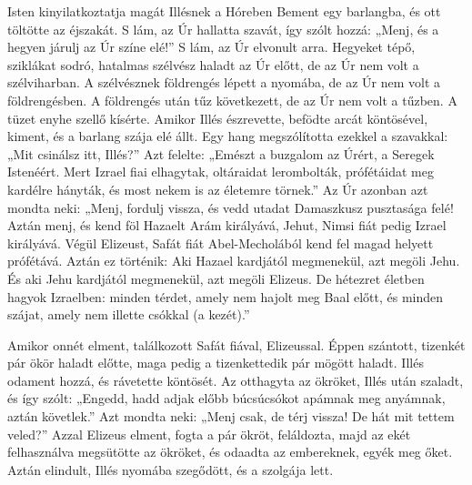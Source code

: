 \documentclass[twoside]{article}
\begin{document}
\begin{lectio}{Isten kinyilatkoztatja magát Illésnek a Hóreben}
Bement egy barlangba, és ott töltötte az éjszakát. S lám, az Úr hallatta szavát, így szólt hozzá: „Menj, és a hegyen járulj az Úr színe elé!” S lám, az Úr elvonult arra. Hegyeket tépő, sziklákat sodró, hatalmas szélvész haladt az Úr előtt, de az Úr nem volt a szélviharban. A szélvésznek földrengés lépett a nyomába, de az Úr nem volt a földrengésben. A földrengés után tűz következett, de az Úr nem volt a tűzben. A tüzet enyhe szellő kísérte. Amikor Illés észrevette, befödte arcát köntösével, kiment, és a barlang szája elé állt. Egy hang megszólította ezekkel a szavakkal: „Mit csinálsz itt, Illés?” Azt felelte: „Emészt a buzgalom az Úrért, a Seregek Istenéért. Mert Izrael fiai elhagytak, oltáraidat lerombolták, prófétáidat meg kardélre hányták, és most nekem is az életemre törnek.” Az Úr azonban azt mondta neki: „Menj, fordulj vissza, és vedd utadat Damaszkusz pusztasága felé! Aztán menj, és kend föl Hazaelt Arám királyává, Jehut, Nimsi fiát pedig Izrael királyává. Végül Elizeust, Safát fiát Abel-Mecholából kend fel magad helyett prófétává. Aztán ez történik: Aki Hazael kardjától megmenekül, azt megöli Jehu. És aki Jehu kardjától megmenekül, azt megöli Elizeus. De hétezret életben hagyok Izraelben: minden térdet, amely nem hajolt meg Baal előtt, és minden szájat, amely nem illette csókkal (a kezét).”

Amikor onnét elment, találkozott Safát fiával, Elizeussal. Éppen szántott, tizenkét pár ökör haladt előtte, maga pedig a tizenkettedik pár mögött haladt. Illés odament hozzá, és rávetette köntösét. Az otthagyta az ökröket, Illés után szaladt, és így szólt: „Engedd, hadd adjak előbb búcsúcsókot apámnak meg anyámnak, aztán követlek.” Azt mondta neki: „Menj csak, de térj vissza! De hát mit tettem veled?” Azzal Elizeus elment, fogta a pár ökröt, feláldozta, majd az ekét felhasználva megsütötte az ökröket, és odaadta az embereknek, egyék meg őket. Aztán elindult, Illés nyomába szegődött, és a szolgája lett.
\end{lectio}


\end{document}

